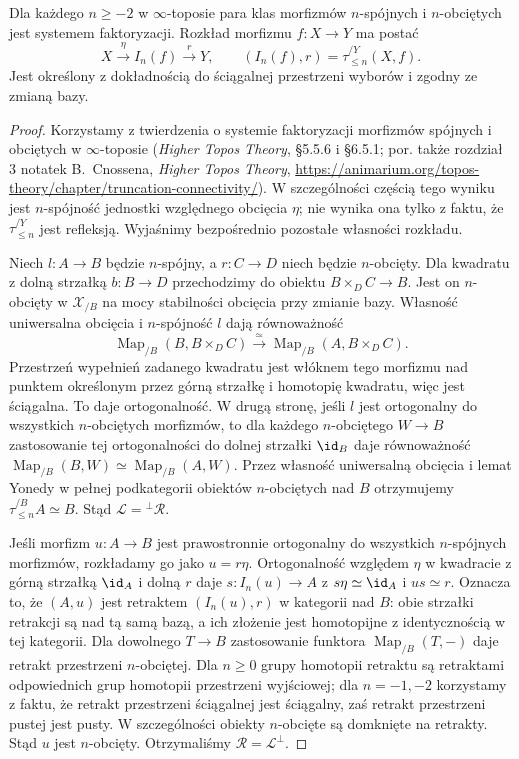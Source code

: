 \begin{twierdzenie}\label{cat:thm:infty-topos-connected-truncated}
Dla każdego $n\geq-2$ w $\infty$-toposie para klas morfizmów $n$-spójnych i $n$-obciętych jest systemem faktoryzacji. Rozkład morfizmu $f:X\to Y$ ma postać
\[
 X\xrightarrow{\eta}I_n(f)\xrightarrow{r}Y,\qquad
 (I_n(f),r)=\tau_{\leq n}^{/Y}(X,f).
\]
Jest określony z dokładnością do ściągalnej przestrzeni wyborów i zgodny ze zmianą bazy.
\end{twierdzenie}
\begin{proof}
Korzystamy z twierdzenia o systemie faktoryzacji morfizmów spójnych i obciętych w $\infty$-toposie (\emph{Higher Topos Theory}, \S5.5.6 i \S6.5.1; por. także rozdział 3 notatek B.~Cnossena, \emph{Higher Topos Theory}, \url{https://animarium.org/topos-theory/chapter/truncation-connectivity/}). W szczególności częścią tego wyniku jest $n$-spójność jednostki względnego obcięcia $\eta$; nie wynika ona tylko z faktu, że $\tau_{\leq n}^{/Y}$ jest refleksją. Wyjaśnimy bezpośrednio pozostałe własności rozkładu.

Niech $l:A\to B$ będzie $n$-spójny, a $r:C\to D$ niech będzie $n$-obcięty. Dla kwadratu z dolną strzałką $b:B\to D$ przechodzimy do obiektu $B\times_D C\to B$. Jest on $n$-obcięty w $\mathcal X_{/B}$ na mocy stabilności obcięcia przy zmianie bazy. Własność uniwersalna obcięcia i $n$-spójność $l$ dają równoważność
\[
 \operatorname{Map}_{/B}(B,B\times_DC)
 \xrightarrow{\simeq}\operatorname{Map}_{/B}(A,B\times_DC).
\]
Przestrzeń wypełnień zadanego kwadratu jest włóknem tego morfizmu nad punktem określonym przez górną strzałkę i homotopię kwadratu, więc jest ściągalna. To daje ortogonalność. W drugą stronę, jeśli $l$ jest ortogonalny do wszystkich $n$-obciętych morfizmów, to dla każdego $n$-obciętego $W\to B$ zastosowanie tej ortogonalności do dolnej strzałki $\id_B$ daje równoważność $\operatorname{Map}_{/B}(B,W)\simeq\operatorname{Map}_{/B}(A,W)$. Przez własność uniwersalną obcięcia i lemat Yonedy w pełnej podkategorii obiektów $n$-obciętych nad $B$ otrzymujemy $\tau_{\leq n}^{/B}A\simeq B$. Stąd $\mathcal L={}^{\perp}\mathcal R$.

Jeśli morfizm $u:A\to B$ jest prawostronnie ortogonalny do wszystkich $n$-spójnych morfizmów, rozkładamy go jako $u=r\eta$. Ortogonalność względem $\eta$ w kwadracie z górną strzałką $\id_A$ i dolną $r$ daje $s:I_n(u)\to A$ z $s\eta\simeq\id_A$ i $us\simeq r$. Oznacza to, że $(A,u)$ jest retraktem $(I_n(u),r)$ w kategorii nad $B$: obie strzałki retrakcji są nad tą samą bazą, a ich złożenie jest homotopijne z identycznością w tej kategorii. Dla dowolnego $T\to B$ zastosowanie funktora $\operatorname{Map}_{/B}(T,-)$ daje retrakt przestrzeni $n$-obciętej. Dla $n\geq0$ grupy homotopii retraktu są retraktami odpowiednich grup homotopii przestrzeni wyjściowej; dla $n=-1,-2$ korzystamy z faktu, że retrakt przestrzeni ściągalnej jest ściągalny, zaś retrakt przestrzeni pustej jest pusty. W szczególności obiekty $n$-obcięte są domknięte na retrakty. Stąd $u$ jest $n$-obcięty. Otrzymaliśmy $\mathcal R=\mathcal L^\perp$.


\end{proof}
